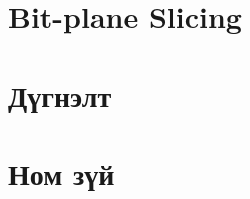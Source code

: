 \documentclass[a4paper]{article}
\begin{document}
\section{Bit-plane Slicing}
\section{Дүгнэлт}
\section{Ном зүй}
\printbibliography[heading=none]
\end{document}
